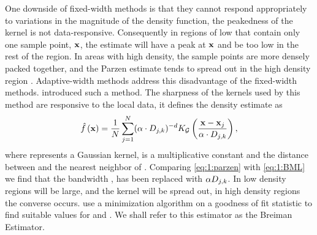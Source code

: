 	One downside of fixed-width methods is that they cannot respond appropriately to variations in the magnitude of the density function, \ie the peakedness of the kernel is not data-responsive. Consequently in regions of low \varDensityFunction{\varPattern} that contain only one sample point, $\varPattern$, the estimate will have a peak at $\varPattern$ and be too low in the rest of the region. In areas with high density, the sample points are more densely packed together, and the Parzen estimate tends to spread out in the high density region \cite{breiman1977variable}. Adaptive-width methods address this disadvantage of the fixed-width methods. \citeauthor{breiman1977variable} introduced such a method. The sharpness of the kernels used by this method are responsive to the local data, it defines the density estimate as
	\begin{equation}\label{eq:1:BML}
	 	\varEstimatedDensityFunction{\varPattern} = \frac{1}{\varNumPatterns} \sum_{j = 1}^{\varNumPatterns} (\varBMLconstant \cdot \varKNNDistance{j}{k})^{-\varDim} \varKernel[\varGaussian]{\frac{\varPattern - \varPattern[j]}{\varBMLconstant \cdot \varKNNDistance{j}{k}}},
	\end{equation} 
	where \varKernel[\varGaussian]{\cdot} represents a Gaussian kernel, \varBMLconstant is a multiplicative constant and  the distance between \varPattern[j] and the \KNNK nearest neighbor of \varPattern[j]. Comparing \cref{eq:1:parzen} with \eqref{eq:1:BML} we find that the bandwidth \varBandwidth, has been replaced with $\alpha D_{j, k}$.  In low density regions  will be large, and the kernel will be spread out, in high density regions the converse occurs. \citeauthor{breiman1977variable} use a minimization algorithm on a goodness of fit statistic to find suitable values for \KNNK and \varBMLconstant. We shall refer to this estimator as the Breiman Estimator. 

